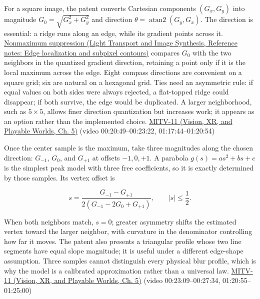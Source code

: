 For a square image, the patent converts Cartesian components \((G_x,G_y)\) into magnitude \(G_0=\sqrt{G_x^2+G_y^2}\) and direction \(\theta=\operatorname{atan2}(G_y,G_x)\). The direction is essential: a ridge runs along an edge, while its gradient points across it. \href{../04-Light-Transport-and-Image-Synthesis/main.pdf\#nameddest=appendix-36022286b03e}{Nonmaximum suppression (Light Transport and Image Synthesis, Reference notes: Edge localization and subpixel contours)} compares \(G_0\) with the two neighbors in the quantized gradient direction, retaining a point only if it is the local maximum across the edge. Eight compass directions are convenient on a square grid; six are natural on a hexagonal grid. Ties need an asymmetric rule: if equal values on both sides were always rejected, a flat-topped ridge could disappear; if both survive, the edge would be duplicated. A larger neighborhood, such as \(5\times5\), allows finer direction quantization but increases work; it appears as an option rather than the implemented choice. \href{../07-Vision-XR-and-Playable-Worlds/main.pdf\#nameddest=04-visual-computing-ii-ch036-mitv-11---edge-detection-subpixel-position-cordic-line-detection-us-6408109}{MITV-11 (Vision, XR, and Playable Worlds, Ch. 5)} (video 00:20:49--00:23:22, 01:17:44--01:20:54)

Once the center sample is the maximum, take three magnitudes along the chosen direction: \(G_{-1}\), \(G_0\), and \(G_{+1}\) at offsets \(-1,0,+1\). A parabola \(g(s)=as^2+bs+c\) is the simplest peak model with three free coefficients, so it is exactly determined by those samples. Its vertex offset is

\[
s=\frac{G_{-1}-G_{+1}}{2(G_{-1}-2G_0+G_{+1})},\qquad |s|\le\frac12.
\]

When both neighbors match, \(s=0\); greater asymmetry shifts the estimated vertex toward the larger neighbor, with curvature in the denominator controlling how far it moves. The patent also presents a triangular profile whose two line segments have equal slope magnitude; it is useful under a different edge-shape assumption. Three samples cannot distinguish every physical blur profile, which is why the model is a calibrated approximation rather than a universal law. \href{../07-Vision-XR-and-Playable-Worlds/main.pdf\#nameddest=04-visual-computing-ii-ch036-mitv-11---edge-detection-subpixel-position-cordic-line-detection-us-6408109}{MITV-11 (Vision, XR, and Playable Worlds, Ch. 5)} (video 00:23:09--00:27:34, 01:20:55--01:25:00)

